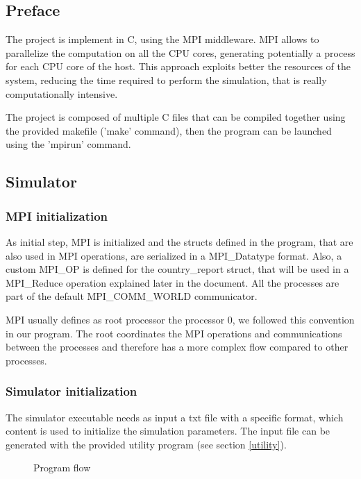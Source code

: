 \documentclass[10pt]{article}
\begin{document}
	\subsection{Preface}
	The project is implement in C, using the MPI middleware. MPI allows to parallelize the computation on all the CPU cores, generating potentially a process for each CPU core of the host. This approach exploits better the resources of the system, reducing the time required to perform the simulation, that is really computationally intensive.
	
	The project is composed of multiple C files that can be compiled together using the provided makefile ('make' command), then the program can be launched using the 'mpirun' command.
	
	\subsection{Simulator}
	\subsubsection{MPI initialization}
	As initial step, MPI is initialized and the structs defined in the program, that are also used in MPI operations, are serialized in a MPI\_Datatype format. Also, a custom MPI\_OP is defined for the country\_report struct, that will be used in a MPI\_Reduce operation explained later in the document. All the processes are part of the default MPI\_COMM\_WORLD communicator. 
	
	MPI usually defines as root processor the processor 0, we followed this convention in our program. The root coordinates the MPI operations and communications between the processes and therefore has a more complex flow compared to other processes.
	
	\subsubsection{Simulator initialization}
	The simulator executable needs as input a txt file with a specific format, which content is used to initialize the simulation parameters. The input file can be generated with the provided utility program (see section \ref{utility}).
	
	\begin{figure}[H]
		\centering
		\caption[]{Program flow}
		\label{fig:p4flow}
	\end{figure}
	
\end{document}

